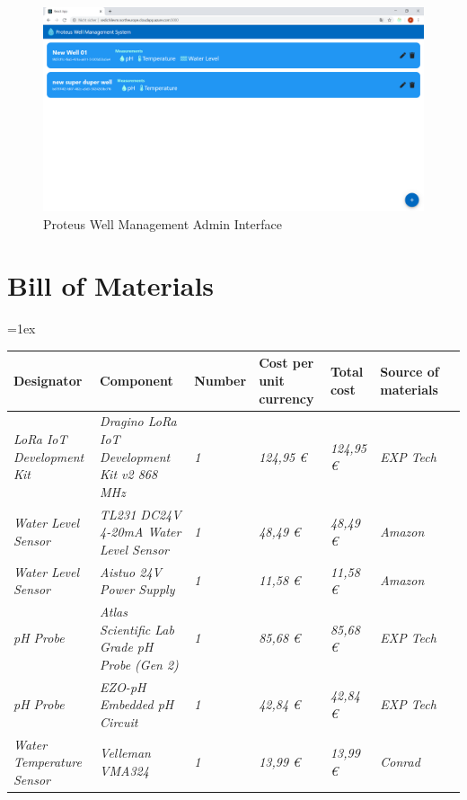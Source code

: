 \documentclass[11pt, letterpaper]{article}
\begin{document}
\begin{figure}[ht!]
	\centering
	\includegraphics[width=16cm]{figures/admin_interface_overview.png}
	\caption{Proteus Well Management Admin Interface}
	\label{fig:admin_interface_overview}
\end{figure}

\section{Bill of Materials}
\tabulinesep=1ex
\begin{tabu} to \linewidth {|X|X|X|X|X|X|X|}
	\hline
	\textbf{Designator} & \textbf{Component} & \textbf{Number} & \textbf{Cost per unit currency} & \textbf{Total cost} & \textbf{Source of materials} \\\hline
	\textit{LoRa IoT Development Kit} & \textit{Dragino LoRa IoT Development Kit v2 868 MHz} & \textit{1} & \textit{124,95 \euro} & \textit{124,95 \euro} & \textit{EXP Tech}\\\hline
	\textit{Water Level Sensor} & \textit{TL231 DC24V 4-20mA Water Level Sensor} & \textit{1} & \textit{48,49 \euro} & \textit{48,49 \euro} & \textit{Amazon}\\\hline
	\textit{Water Level Sensor} & \textit{Aistuo 24V Power Supply} & \textit{1} & \textit{11,58 \euro} & \textit{11,58 \euro} & \textit{Amazon}\\\hline
	\textit{pH Probe} & \textit{Atlas Scientific Lab Grade pH Probe (Gen 2)} & \textit{1} & \textit{85,68 \euro} & \textit{85,68 \euro} & \textit{EXP Tech}\\\hline
	\textit{pH Probe} & \textit{EZO-pH Embedded pH Circuit} & \textit{1} & \textit{42,84 \euro} & \textit{42,84 \euro} & \textit{EXP Tech}\\\hline
	\textit{Water Temperature Sensor} & \textit{Velleman VMA324} & \textit{1} & \textit{13,99 \euro} & \textit{13,99 \euro} & \textit{Conrad}\\\hline
\end{tabu}
\end{document}
